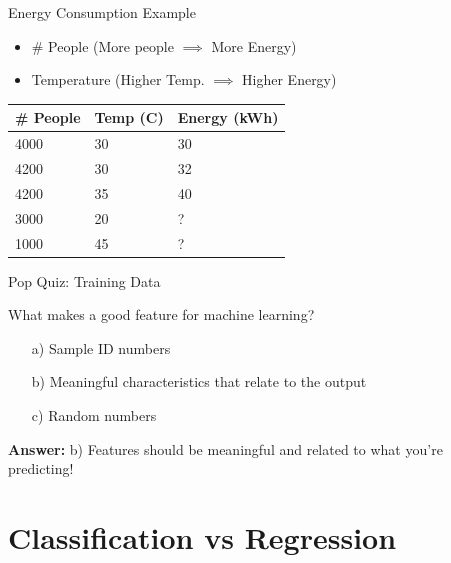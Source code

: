 \documentclass[dvipsnames]{beamer}
\begin{document}
\begin{frame}{Energy Consumption Example}
\begin{itemize}
	\item \# People (More people $\implies$ More Energy)
	\item \pause Temperature (Higher Temp. $\implies$ Higher Energy)
\end{itemize}

\pause \begin{table}[]
	\begin{tabular}{|l|l||l|}
		\hline 
		
		\textbf{\# People} & \textbf{Temp (C)} &  \textbf{Energy (kWh)} \\ \hline 
		
		4000 & 30 & 30 \\
		4200 & 30 & 32 \\
		4200 & 35 & 40 \\ \hline
		3000 & 20& ? \\
		1000 & 45 & ? \\ \hline          
	\end{tabular}
\end{table}
\end{frame}

\begin{frame}{Pop Quiz: Training Data}
\begin{popquizbox}{2}
What makes a good feature for machine learning?
\begin{enumerate}
\item[a)] Sample ID numbers
\item[b)] Meaningful characteristics that relate to the output
\item[c)] Random numbers
\end{enumerate}

\vspace{0.5em}
\textbf{Answer:} b) Features should be meaningful and related to what you're predicting!
\end{popquizbox}
\end{frame}

\section{Classification vs Regression}
\end{document}
